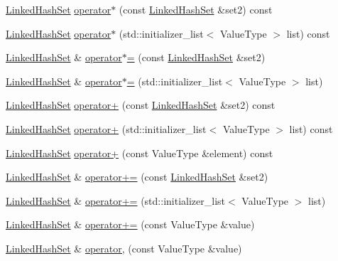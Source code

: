 \begin{DoxyCompactItemize}
\item 
\mbox{\hyperlink{classLinkedHashSet}{Linked\+Hash\+Set}} \mbox{\hyperlink{classLinkedHashSet_a4d330e878b7b0407be1423ba61749e7b}{operator$\ast$}} (const \mbox{\hyperlink{classLinkedHashSet}{Linked\+Hash\+Set}} \&set2) const
\item 
\mbox{\hyperlink{classLinkedHashSet}{Linked\+Hash\+Set}} \mbox{\hyperlink{classLinkedHashSet_a2e1b5e7ece8a613b8598cb9357497fe1}{operator$\ast$}} (std\+::initializer\+\_\+list$<$ Value\+Type $>$ list) const
\item 
\mbox{\hyperlink{classLinkedHashSet}{Linked\+Hash\+Set}} \& \mbox{\hyperlink{classLinkedHashSet_a7c5fd07c05ab45a7e2c8e0ca849586da}{operator$\ast$=}} (const \mbox{\hyperlink{classLinkedHashSet}{Linked\+Hash\+Set}} \&set2)
\item 
\mbox{\hyperlink{classLinkedHashSet}{Linked\+Hash\+Set}} \& \mbox{\hyperlink{classLinkedHashSet_a73d1c803748d3463091eeeb699f51d02}{operator$\ast$=}} (std\+::initializer\+\_\+list$<$ Value\+Type $>$ list)
\item 
\mbox{\hyperlink{classLinkedHashSet}{Linked\+Hash\+Set}} \mbox{\hyperlink{classLinkedHashSet_a186c80b6e63711deeff5824b19ec1f9b}{operator+}} (const \mbox{\hyperlink{classLinkedHashSet}{Linked\+Hash\+Set}} \&set2) const
\item 
\mbox{\hyperlink{classLinkedHashSet}{Linked\+Hash\+Set}} \mbox{\hyperlink{classLinkedHashSet_a844d11fefcbce2c32987250561006c0b}{operator+}} (std\+::initializer\+\_\+list$<$ Value\+Type $>$ list) const
\item 
\mbox{\hyperlink{classLinkedHashSet}{Linked\+Hash\+Set}} \mbox{\hyperlink{classLinkedHashSet_a47b1f81356522a5d84a26f97644a01c0}{operator+}} (const Value\+Type \&element) const
\item 
\mbox{\hyperlink{classLinkedHashSet}{Linked\+Hash\+Set}} \& \mbox{\hyperlink{classLinkedHashSet_a5d639abbe4ef9c9b1db9eaa994bc0a92}{operator+=}} (const \mbox{\hyperlink{classLinkedHashSet}{Linked\+Hash\+Set}} \&set2)
\item 
\mbox{\hyperlink{classLinkedHashSet}{Linked\+Hash\+Set}} \& \mbox{\hyperlink{classLinkedHashSet_a013dbb723a689628f8f468cec87a2110}{operator+=}} (std\+::initializer\+\_\+list$<$ Value\+Type $>$ list)
\item 
\mbox{\hyperlink{classLinkedHashSet}{Linked\+Hash\+Set}} \& \mbox{\hyperlink{classLinkedHashSet_afdf15a8116d4641e68e1088131e7fcf7}{operator+=}} (const Value\+Type \&value)
\item 
\mbox{\hyperlink{classLinkedHashSet}{Linked\+Hash\+Set}} \& \mbox{\hyperlink{classLinkedHashSet_a9e7cf91d4c12f981ef44ea2c6979eadb}{operator,}} (const Value\+Type \&value)

\end{DoxyCompactItemize}
